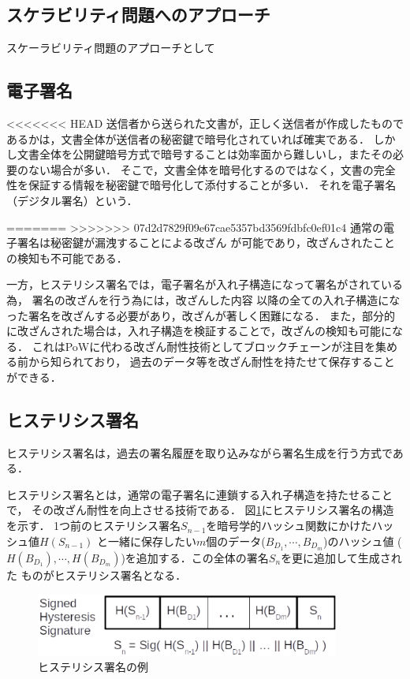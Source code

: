 \documentclass[a4paper,12pt]{jsarticle}
\begin{document}
      \subsection{スケラビリティ問題へのアプローチ}
スケーラビリティ問題のアプローチとして

      \subsection{電子署名}
<<<<<<< HEAD
送信者から送られた文書が，正しく送信者が作成したものであるかは，文書全体が送信者の秘密鍵で暗号化されていれば確実である．
しかし文書全体を公開鍵暗号方式で暗号することは効率面から難しいし，またその必要のない場合が多い．
そこで，文書全体を暗号化するのではなく，文書の完全性を保証する情報を秘密鍵で暗号化して添付することが多い．
それを電子署名（デジタル署名）という．

=======
>>>>>>> 07d2d7829f09e67cae5357bd3569fdbfc0ef01c4
通常の電子署名は秘密鍵が漏洩することによる改ざん
が可能であり，改ざんされたことの検知も不可能である．

一方，ヒステリシス署名では，電子署名が入れ子構造になって署名がされている為，
署名の改ざんを行う為には，改ざんした内容
以降の全ての入れ子構造になった署名を改ざんする必要があり，改ざんが著しく困難になる．
また，部分的に改ざんされた場合は，入れ子構造を検証することで，改ざんの検知も可能になる．
これはPoWに代わる改ざん耐性技術としてブロックチェーンが注目を集める前から知られており，
過去のデータ等を改ざん耐性を持たせて保存することができる．

      \subsection{ヒステリシス署名}

ヒステリシス署名は，過去の署名履歴を取り込みながら署名生成を行う方式である．

ヒステリシス署名\cite{suzaki}とは，通常の電子署名に連鎖する入れ子構造を持たせることで，
その改ざん耐性を向上させる技術である．
図\ref{fig:hysteresis}にヒステリシス署名の構造を示す．
1つ前のヒステリシス署名$S_{n-1}$を暗号学的ハッシュ関数にかけたハッシュ値$H(S_{n-1})$
と一緒に保存したい$m$個のデータ($B_{D_1}, \cdots, B_{D_m}$)のハッシュ値
($H(B_{D_1}), \cdots, H(B_{D_m})$)を追加する．この全体の署名$S_n$を更に追加して生成された
ものがヒステリシス署名となる．

\begin{figure}[H]%
  \begin{center}
    \includegraphics[width=100mm]{pht/hysteresis_signature.eps}
  \end{center}
  \caption{ヒステリシス署名の例}
  \label{fig:hysteresis}
\end{figure}
\end{document}
